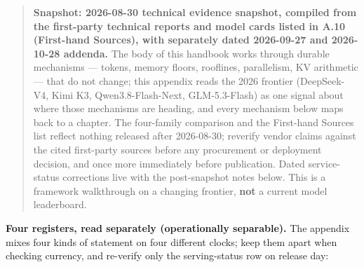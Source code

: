 \begin{quote}
\textbf{Snapshot: 2026-08-30 technical evidence snapshot, compiled from
the first-party technical reports and model cards listed in A.10
(First-hand Sources), with separately dated 2026-09-27 and 2026-10-28
addenda.} The body of this handbook works through durable mechanisms ---
tokens, memory floors, rooflines, parallelism, KV arithmetic --- that do
not change; this appendix reads the 2026 frontier (DeepSeek-V4, Kimi K3,
Qwen3.8-Flash-Next, GLM-5.3-Flash) as one signal about where those
mechanisms are heading, and every mechanism below maps back to a
chapter. The four-family comparison and the First-hand Sources list
reflect nothing released after 2026-08-30; reverify vendor claims
against the cited first-party sources before any procurement or
deployment decision, and once more immediately before publication. Dated
service-status corrections live with the post-snapshot notes below. This
is a framework walkthrough on a changing frontier, \textbf{not} a
current model leaderboard.
\end{quote}

\textbf{Four registers, read separately (operationally separable).} The
appendix mixes four kinds of statement on four different clocks; keep
them apart when checking currency, and re-verify only the serving-status
row on release day:

